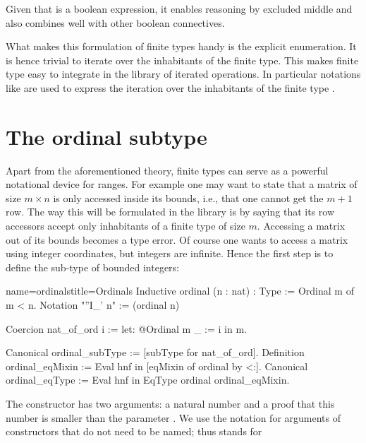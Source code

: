Given that \C{[forall x, P x]} is a boolean expression,
it enables reasoning by excluded middle and also combines well with
other boolean connectives.

What makes this formulation of finite types handy is the explicit
enumeration.  It is hence trivial to iterate over the inhabitants of the
finite type.  This makes finite type easy to integrate in the
library of iterated operations.  In particular notations like
 are used to express the iteration over the
inhabitants of the finite type .

\section{The ordinal subtype}\label{sec:ordfintype}

Apart from the aforementioned theory, finite types can serve as a
powerful notational device for ranges.  For example one may want
to state that a matrix of size $m \times n$ is only accessed inside
its bounds, i.e., that one cannot get the $m+1$ row.  The way this will
be formulated in the \mcbMC{} library is by saying that its row
accessors accept only inhabitants of a finite type of size $m$.
Accessing a matrix out of its bounds becomes a type error.
Of course one wants to access a matrix using integer coordinates, but
integers are infinite.  Hence the first step is to define the sub-type
of bounded integers:

\begin{coq}{name=ordinals}{title=Ordinals}
Inductive ordinal (n : nat) : Type := Ordinal m of m < n.
Notation "''I_' n" := (ordinal n)

Coercion nat_of_ord i := let: @Ordinal m _ := i in m.

Canonical ordinal_subType := [subType for nat_of_ord].
Definition ordinal_eqMixin := Eval hnf in [eqMixin of ordinal by <:].
Canonical ordinal_eqType := Eval hnf in EqType ordinal ordinal_eqMixin.
\end{coq}
The constructor  has two arguments: a natural number 
and a proof that this number is smaller than the parameter . We
use the  notation for arguments of constructors that do not need
to be named; thus  stands for


